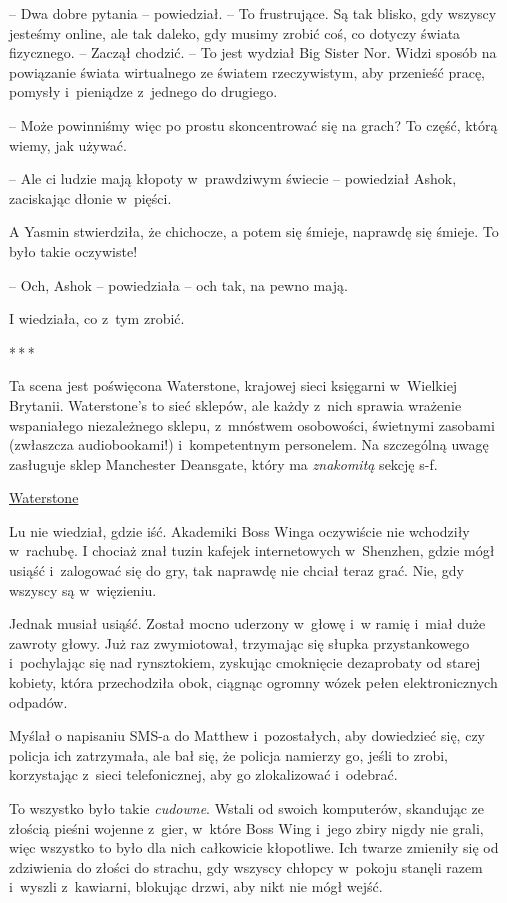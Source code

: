 \documentclass[oneside,polish,11pt,rmheadings]{mwbk}
\newcommand{\threeast}{\par\centerline{*\,*\,*}\medskip\par}
\begin{document}
-- Dwa dobre pytania -- powiedział. -- To frustrujące. Są tak blisko, gdy wszyscy jesteśmy online, ale tak daleko, gdy musimy zrobić coś, co dotyczy świata fizycznego. -- Zaczął chodzić. -- To jest wydział Big Sister Nor. Widzi sposób na powiązanie świata wirtualnego ze światem rzeczywistym, aby przenieść pracę, pomysły i~pieniądze z~jednego do drugiego.

-- Może powinniśmy więc po prostu skoncentrować się na grach? To część, którą wiemy, jak używać.

-- Ale ci ludzie mają kłopoty w~prawdziwym świecie -- powiedział Ashok, zaciskając dłonie w~pięści.

A Yasmin stwierdziła, że chichocze, a potem się śmieje, naprawdę się śmieje. To było takie oczywiste!

-- Och, Ashok -- powiedziała -- och tak, na pewno mają.

I wiedziała, co z~tym zrobić.

\bigskip
\threeast

Ta scena jest poświęcona Waterstone, krajowej sieci księgarni w~Wielkiej Brytanii. Waterstone's to sieć sklepów, ale każdy z~nich sprawia wrażenie wspaniałego niezależnego sklepu, z~mnóstwem osobowości, świetnymi zasobami (zwłaszcza audiobookami!) i~kompetentnym personelem. Na szczególną uwagę zasługuje sklep Manchester Deansgate, który ma \textit{znakomitą }sekcję s-f.

\href{https://www.waterstones.com/}{Waterstone}

Lu nie wiedział, gdzie iść. Akademiki Boss Winga oczywiście nie wchodziły w~rachubę. I chociaż znał tuzin kafejek internetowych w~Shenzhen, gdzie mógł usiąść i~zalogować się do gry, tak naprawdę nie chciał teraz grać. Nie, gdy wszyscy są w~więzieniu.

Jednak musiał usiąść. Został mocno uderzony w~głowę i~w ramię i~miał duże zawroty głowy. Już raz zwymiotował, trzymając się słupka przystankowego i~pochylając się nad rynsztokiem, zyskując cmoknięcie dezaprobaty od starej kobiety, która przechodziła obok, ciągnąc ogromny wózek pełen elektronicznych odpadów.

Myślał o napisaniu SMS-a do Matthew i~pozostałych, aby dowiedzieć się, czy policja ich zatrzymała, ale bał się, że policja namierzy go, jeśli to zrobi, korzystając z~sieci telefonicznej, aby go zlokalizować i~odebrać.

To wszystko było takie \textit{cudowne}. Wstali od swoich komputerów, skandując ze złością pieśni wojenne z~gier, w~które Boss Wing i~jego zbiry nigdy nie grali, więc wszystko to było dla nich całkowicie kłopotliwe. Ich twarze zmieniły się od zdziwienia do złości do strachu, gdy wszyscy chłopcy w~pokoju stanęli razem i~wyszli z~kawiarni, blokując drzwi, aby nikt nie mógł wejść.
\end{document}
